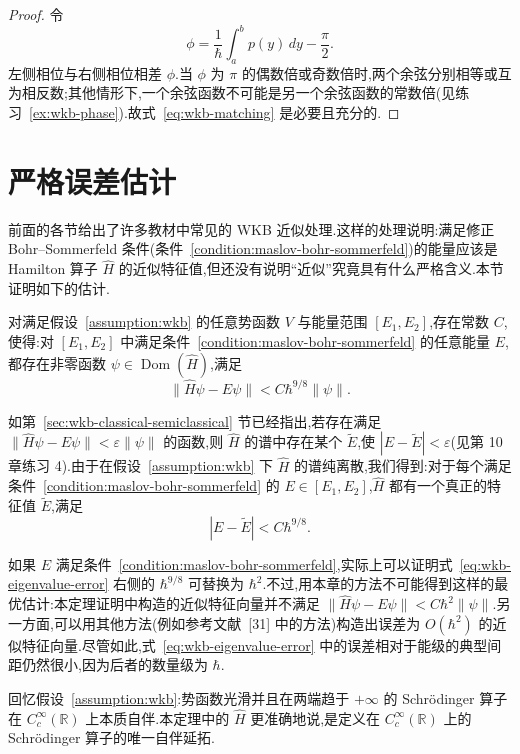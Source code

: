 \begin{proof}
令
\[
\phi=\frac1\hbar\int_a^bp(y)\,dy-\frac\pi2.
\]
左侧相位与右侧相位相差 $\phi$.当 $\phi$ 为 $\pi$ 的偶数倍或奇数倍时,两个余弦分别相等或互为相反数;其他情形下,一个余弦函数不可能是另一个余弦函数的常数倍(见练习~\ref{ex:wkb-phase}).故式~\eqref{eq:wkb-matching} 是必要且充分的.
\end{proof}

\section{严格误差估计}
\label{sec:wkb-rigorous-error}

前面的各节给出了许多教材中常见的 WKB 近似处理.这样的处理说明:满足修正 Bohr--Sommerfeld 条件(条件~\ref{condition:maslov-bohr-sommerfeld})的能量应该是 Hamilton 算子 $\widehat H$ 的近似特征值,但还没有说明“近似”究竟具有什么严格含义.本节证明如下的估计.

\begin{theorem}\label{thm:wkb-rigorous-error}
对满足假设~\ref{assumption:wkb} 的任意势函数 $V$ 与能量范围 $[E_1,E_2]$,存在常数 $C$,使得:对 $[E_1,E_2]$ 中满足条件~\ref{condition:maslov-bohr-sommerfeld} 的任意能量 $E$,都存在非零函数 $\psi\in\operatorname{Dom}(\widehat H)$,满足
\[
\|\widehat H\psi-E\psi\|<C\hbar^{9/8}\|\psi\|.
\label{eq:wkb-rigorous-residual}
\]
\end{theorem}

如第~\ref{sec:wkb-classical-semiclassical} 节已经指出,若存在满足
$\|\widehat H\psi-E\psi\|<\varepsilon\|\psi\|$ 的函数,则 $\widehat H$ 的谱中存在某个 $\widetilde E$,使 $|E-\widetilde E|<\varepsilon$(见第 10 章练习 4).由于在假设~\ref{assumption:wkb} 下 $\widehat H$ 的谱纯离散,我们得到:对于每个满足条件~\ref{condition:maslov-bohr-sommerfeld} 的 $E\in[E_1,E_2]$,$\widehat H$ 都有一个真正的特征值 $\widetilde E$,满足
\[
|E-\widetilde E|<C\hbar^{9/8}.
\label{eq:wkb-eigenvalue-error}
\]

如果 $E$ 满足条件~\ref{condition:maslov-bohr-sommerfeld},实际上可以证明式~\eqref{eq:wkb-eigenvalue-error} 右侧的 $\hbar^{9/8}$ 可替换为 $\hbar^2$.不过,用本章的方法不可能得到这样的最优估计:本定理证明中构造的近似特征向量并不满足 $\|\widehat H\psi-E\psi\|<C\hbar^2\|\psi\|$.另一方面,可以用其他方法(例如参考文献~[31] 中的方法)构造出误差为 $O(\hbar^2)$ 的近似特征向量.尽管如此,式~\eqref{eq:wkb-eigenvalue-error} 中的误差相对于能级的典型间距仍然很小,因为后者的数量级为 $\hbar$.

回忆假设~\ref{assumption:wkb}:势函数光滑并且在两端趋于 $+\infty$ 的 Schrödinger 算子在 $C_c^\infty(\mathbb R)$ 上本质自伴.本定理中的 $\widehat H$ 更准确地说,是定义在 $C_c^\infty(\mathbb R)$ 上的 Schrödinger 算子的唯一自伴延拓.

